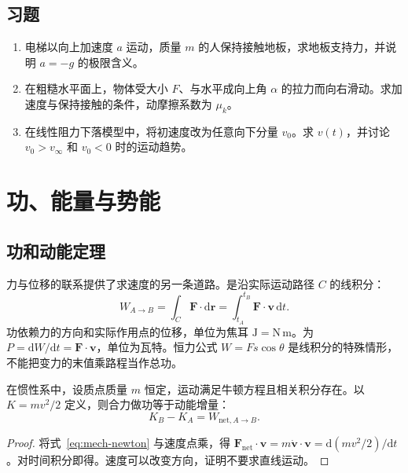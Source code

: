 \documentclass[UTF8,12pt,a4paper,fontset=fandol]{ctexbook}
\begin{document}
\section{习题}
\begin{enumerate}[label=\thechapter.\arabic*,ref=\thechapter.\arabic*]
\item\label{exr:mech-elevator} 电梯以向上加速度 $a$ 运动，质量 $m$ 的人保持接触地板，求地板支持力，并说明 $a=-g$ 的极限含义。
\item\label{exr:mech-pull} 在粗糙水平面上，物体受大小 $F$、与水平成向上角 $\alpha$ 的拉力而向右滑动。求加速度与保持接触的条件，动摩擦系数为 $\mu_k$。
\item\label{exr:mech-drag-initial} 在线性阻力下落模型中，将初速度改为任意向下分量 $v_0$。求 $v(t)$，并讨论 $v_0>v_\infty$ 和 $v_0<0$ 时的运动趋势。
\end{enumerate}

\chapter{功、能量与势能}
\label{chap:mech-energy}

\section{功和动能定理}
力与位移的联系提供了求速度的另一条道路。是沿实际运动路径 $C$ 的线积分：
\begin{equation}
 W_{A\to B}=\int_C\mathbf F\cdot\mathrm d\mathbf r
 =\int_{t_A}^{t_B}\mathbf F\cdot\mathbf v\,\mathrm dt.
 \label{eq:mech-work}
\end{equation}
功依赖力的方向和实际作用点的位移，单位为焦耳 $\mathrm J=\mathrm{N\,m}$。为 $P=\mathrm dW/\mathrm dt=\mathbf F\cdot\mathbf v$，单位为瓦特。恒力公式 $W=Fs\cos\theta$ 是线积分的特殊情形，不能把变力的末值乘路程当作总功。

\begin{theorem}[质点动能定理]
在惯性系中，设质点质量 $m$ 恒定，运动满足牛顿方程且相关积分存在。以 $K=mv^2/2$ 定义，则合力做功等于动能增量：
\begin{equation}
 K_B-K_A=W_{\mathrm{net},A\to B}.
 \label{eq:mech-work-energy}
\end{equation}
\end{theorem}
\begin{proof}
将式~\eqref{eq:mech-newton} 与速度点乘，得 $\mathbf F_{\mathrm{net}}\cdot\mathbf v=m\dot{\mathbf v}\cdot\mathbf v=\mathrm d(mv^2/2)/\mathrm dt$。对时间积分即得。速度可以改变方向，证明不要求直线运动。
\end{proof}
\end{document}

